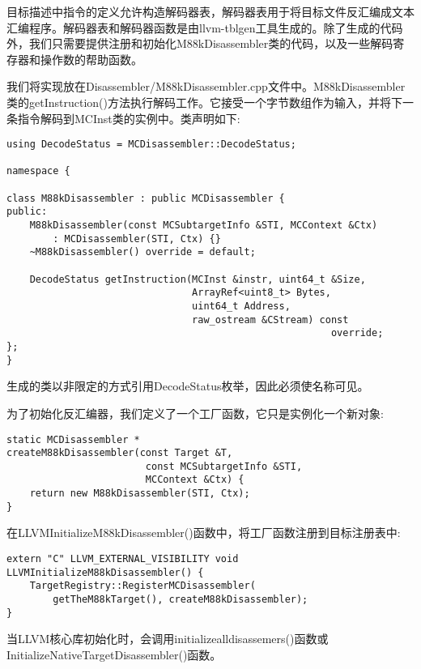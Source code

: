 目标描述中指令的定义允许构造解码器表，解码器表用于将目标文件反汇编成文本汇编程序。解码器表和解码器函数是由llvm-tblgen工具生成的。除了生成的代码外，我们只需要提供注册和初始化M88kDisassembler类的代码，以及一些解码寄存器和操作数的帮助函数。\par

我们将实现放在Disassembler/M88kDisassembler.cpp文件中。M88kDisassembler类的getInstruction()方法执行解码工作。它接受一个字节数组作为输入，并将下一条指令解码到MCInst类的实例中。类声明如下:\par

\begin{lstlisting}[caption={}]
using DecodeStatus = MCDisassembler::DecodeStatus;

namespace {
	
class M88kDisassembler : public MCDisassembler {
public:
	M88kDisassembler(const MCSubtargetInfo &STI, MCContext &Ctx)
		: MCDisassembler(STI, Ctx) {}
	~M88kDisassembler() override = default;
	
	DecodeStatus getInstruction(MCInst &instr, uint64_t &Size,
								ArrayRef<uint8_t> Bytes,
								uint64_t Address,
								raw_ostream &CStream) const
														override;
};
}
\end{lstlisting}

生成的类以非限定的方式引用DecodeStatus枚举，因此必须使名称可见。\par

为了初始化反汇编器，我们定义了一个工厂函数，它只是实例化一个新对象:\par

\begin{lstlisting}[caption={}]
static MCDisassembler *
createM88kDisassembler(const Target &T,
						const MCSubtargetInfo &STI,
						MCContext &Ctx) {
	return new M88kDisassembler(STI, Ctx);
}
\end{lstlisting}

在LLVMInitializeM88kDisassembler()函数中，将工厂函数注册到目标注册表中:\par

\begin{lstlisting}[caption={}]
extern "C" LLVM_EXTERNAL_VISIBILITY void
LLVMInitializeM88kDisassembler() {
	TargetRegistry::RegisterMCDisassembler(
		getTheM88kTarget(), createM88kDisassembler);
}
\end{lstlisting}

当LLVM核心库初始化时，会调用initializealldisassemers()函数或InitializeNativeTargetDisassembler()函数。\par

